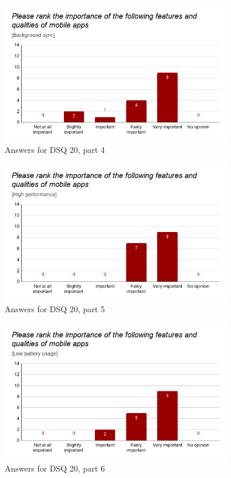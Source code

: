 \documentclass[a4paper,12pt]{article}
\begin{document}
\begin{figure}[ht!]
    \centering
    \includegraphics[width=10cm]{img/Results/dsq20_4.png}
    \caption{Answers for DSQ 20, part 4}
    \label{fig:res_devq20_4}
\end{figure}

\begin{figure}[ht!]
    \centering
    \includegraphics[width=10cm]{img/Results/dsq20_5.png}
    \caption{Answers for DSQ 20, part 5}
    \label{fig:res_devq20_5}
\end{figure}

\begin{figure}[ht!]
    \centering
    \includegraphics[width=10cm]{img/Results/dsq20_6.png}
    \caption{Answers for DSQ 20, part 6}
    \label{fig:res_devq20_6}
\end{figure}
\newpage
\end{document}

